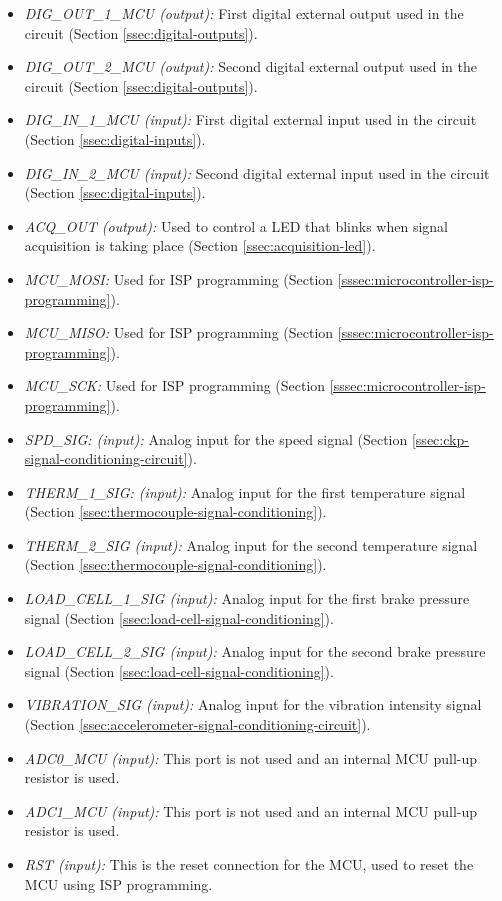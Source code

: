\begin{itemize}
					\item \textit{DIG_OUT_1_MCU (output):} First digital external output used in the circuit (Section \ref{ssec:digital-outputs}).
					\item \textit{DIG_OUT_2_MCU (output):} Second digital external output used in the circuit (Section \ref{ssec:digital-outputs}).
					\item \textit{DIG_IN_1_MCU (input):} First digital external input used in the circuit (Section \ref{ssec:digital-inputs}).
					\item \textit{DIG_IN_2_MCU (input):} Second digital external input used in the circuit (Section \ref{ssec:digital-inputs}). 
					\item \textit{ACQ_OUT (output):} Used to control a LED that blinks when signal acquisition is taking place (Section \ref{ssec:acquisition-led}).   
					\item \textit{MCU_MOSI:} Used for ISP programming (Section \ref{sssec:microcontroller-isp-programming}).
					\item \textit{MCU_MISO:} Used for ISP programming (Section \ref{sssec:microcontroller-isp-programming}).
					\item \textit{MCU_SCK:} Used for ISP programming (Section \ref{sssec:microcontroller-isp-programming}).
					\item \textit{SPD_SIG: (input):} Analog input for the speed signal (Section \ref{ssec:ckp-signal-conditioning-circuit}).
					\item \textit{THERM_1_SIG: (input):} Analog input for the first temperature signal (Section \ref{ssec:thermocouple-signal-conditioning}).
					\item \textit{THERM_2_SIG (input):} Analog input for the second temperature signal (Section \ref{ssec:thermocouple-signal-conditioning}). 
					\item \textit{LOAD_CELL_1_SIG (input):} Analog input for the first brake pressure signal (Section \ref{ssec:load-cell-signal-conditioning}).  
					\item \textit{LOAD_CELL_2_SIG (input):} Analog input for the second brake pressure signal (Section \ref{ssec:load-cell-signal-conditioning}). 
					\item \textit{VIBRATION_SIG (input):} Analog input for the vibration intensity signal (Section \ref{ssec:accelerometer-signal-conditioning-circuit}).
					\item \textit{ADC0_MCU (input):} This port is not used and an internal MCU pull-up resistor is used.
					\item \textit{ADC1_MCU (input):} This port is not used and an internal MCU pull-up resistor is used.
					\item \textit{RST (input):} This is the reset connection for the MCU, used to reset the MCU using ISP programming.
				\end{itemize}
		
